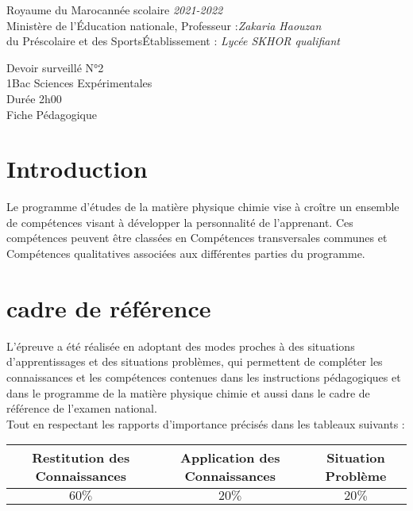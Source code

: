 \documentclass[12pt]{article}
\newcommand\headerMe[2]{\noindent{}#1\hfill#2}
\begin{document}
\headerMe{Royaume du Maroc}{année scolaire \emph{2021-2022}}\\
\headerMe{Ministère de l'Éducation nationale, }{  Professeur :\emph{Zakaria Haouzan}}\\
\headerMe{du Préscolaire et des Sports}{Établissement : \emph{Lycée SKHOR qualifiant}}\\

\begin{center}
Devoir surveillé N°2 \\
1Bac Sciences Expérimentales\\
Durée 2h00
\\
    \vspace{.2cm}
\hrulefill
\Large{Fiche Pédagogique}
\hrulefill\\
\end{center}


\section[A]{Introduction }
\hspace{0.5cm}Le programme d'études de la matière physique chimie vise à croître un ensemble de compétences visant à développer la personnalité de l'apprenant. Ces compétences peuvent être classées en Compétences transversales communes et Compétences qualitatives associées aux différentes parties du programme.
\section{cadre de référence }
 \hspace{0.5cm}L'épreuve a été réalisée en adoptant des modes proches à des situations d'apprentissages et des situations problèmes, qui permettent de compléter les connaissances et les compétences contenues dans les instructions pédagogiques et dans le programme de la matière physique chimie et aussi dans le cadre de référence de l'examen national. 
 \\Tout en respectant les rapports d'importance précisés dans les tableaux suivants :
 \begin{center}
\begin{tabular}{|c||c||c|}
\hline
    \textbf{Restitution des Connaissances} & \textbf{Application des Connaissances} & \textbf{Situation Problème }\\
    \hline
    $60\%$ & $20\%$ & $20\%$\\
    \hline
\end{tabular} 
\end{center}
\end{document}

